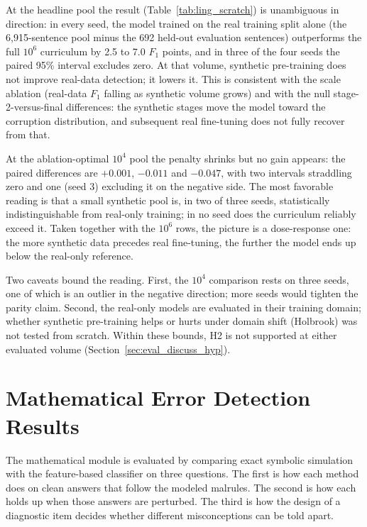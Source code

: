 At the headline pool the result (Table~\ref{tab:ling_scratch}) is unambiguous in direction: in every seed, the model trained on the real training split alone (the 6{,}915-sentence pool minus the 692 held-out evaluation sentences) outperforms the full $10^6$ curriculum by 2.5 to 7.0 $F_1$ points, and in three of the four seeds the paired 95\% interval excludes zero. At that volume, synthetic pre-training does not improve real-data detection; it lowers it. This is consistent with the scale ablation (real-data $F_1$ falling as synthetic volume grows) and with the null stage-2-versus-final differences: the synthetic stages move the model toward the corruption distribution, and subsequent real fine-tuning does not fully recover from that.

At the ablation-optimal $10^4$ pool the penalty shrinks but no gain appears: the paired differences are $+0.001$, $-0.011$ and $-0.047$, with two intervals straddling zero and one (seed 3) excluding it on the negative side. The most favorable reading is that a small synthetic pool is, in two of three seeds, statistically indistinguishable from real-only training; in no seed does the curriculum reliably exceed it. Taken together with the $10^6$ rows, the picture is a dose-response one: the more synthetic data precedes real fine-tuning, the further the model ends up below the real-only reference.

Two caveats bound the reading. First, the $10^4$ comparison rests on three seeds, one of which is an outlier in the negative direction; more seeds would tighten the parity claim. Second, the real-only models are evaluated in their training domain; whether synthetic pre-training helps or hurts under domain shift (Holbrook) was not tested from scratch. Within these bounds, H2 is not supported at either evaluated volume (Section~\ref{sec:eval_discuss_hyp}).

\section{Mathematical Error Detection Results}
\label{sec:eval_math}

The mathematical module is evaluated by comparing exact symbolic simulation with the feature-based classifier on three questions. The first is how each method does on clean answers that follow the modeled malrules. The second is how each holds up when those answers are perturbed. The third is how the design of a diagnostic item decides whether different misconceptions can be told apart.

